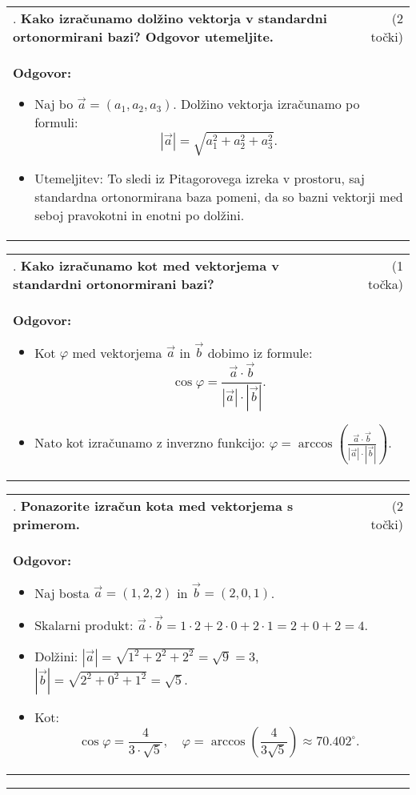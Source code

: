 \documentclass[12pt]{article}
\newcounter{vprasanje}[section]
\renewcommand{\thevprasanje}{\roman{vprasanje}}
\newcommand{\vprasanje}[2]{%
  \stepcounter{vprasanje}%
  \textbf{\thevprasanje}. \textbf{#1} & (#2) \\
}
\newcommand{\odgovor}[1]{%
  \multicolumn{2}{p{\dimexpr\textwidth-2\tabcolsep\relax}}{%
    \small \textbf{Odgovor:} #1%
  } \\[1em]%
}
\newcommand{\crta}{\rule{\textwidth}{0.4pt}}
\newcommand{\razmak}[1]{%
  \vspace{#1}
}
\begin{document}
\begin{tabularx}{\textwidth}{X r}
\vprasanje{Kako izračunamo dolžino vektorja v standardni ortonormirani bazi? Odgovor utemeljite.}{2 točki}
\odgovor{
\begin{itemize}
  \item Naj bo $\vec{a} = (a_1, a_2, a_3)$. Dolžino vektorja izračunamo po formuli:
  \[
  |\vec{a}| = \sqrt{a_1^2 + a_2^2 + a_3^2}.
  \]
  \item Utemeljitev: To sledi iz Pitagorovega izreka v prostoru, saj standardna ortonormirana baza pomeni, da so bazni vektorji med seboj pravokotni in enotni po dolžini.
\end{itemize}
}
\end{tabularx}

\begin{tabularx}{\textwidth}{X r}
\vprasanje{Kako izračunamo kot med vektorjema v standardni ortonormirani bazi?}{1 točka}
\odgovor{
\begin{itemize}
  \item Kot $\varphi$ med vektorjema $\vec{a}$ in $\vec{b}$ dobimo iz formule:
  \[
  \cos \varphi = \frac{\vec{a} \cdot \vec{b}}{|\vec{a}| \cdot |\vec{b}|}.
  \]
  \item Nato kot izračunamo z inverzno funkcijo: $\varphi = \arccos\left( \frac{\vec{a} \cdot \vec{b}}{|\vec{a}| \cdot |\vec{b}|} \right)$.
\end{itemize}
}
\end{tabularx}

\begin{tabularx}{\textwidth}{X r}
\vprasanje{Ponazorite izračun kota med vektorjema s primerom.}{2 točki}
\odgovor{
\begin{itemize}
  \item Naj bosta $\vec{a} = (1, 2, 2)$ in $\vec{b} = (2, 0, 1)$.
  \item Skalarni produkt: $\vec{a} \cdot \vec{b} = 1 \cdot 2 + 2 \cdot 0 + 2 \cdot 1 = 2 + 0 + 2 = 4$.
  \item Dolžini: $|\vec{a}| = \sqrt{1^2 + 2^2 + 2^2} = \sqrt{9} = 3$, $|\vec{b}| = \sqrt{2^2 + 0^2 + 1^2} = \sqrt{5}$.
  \item Kot: 
  \[
  \cos \varphi = \frac{4}{3 \cdot \sqrt{5}}, \quad \varphi = \arccos\left(\frac{4}{3\sqrt{5}}\right) \approx 70.402^\circ.
  \]
\end{itemize}
}
\end{tabularx}

\razmak{0.5em}


\crta
\end{document}
